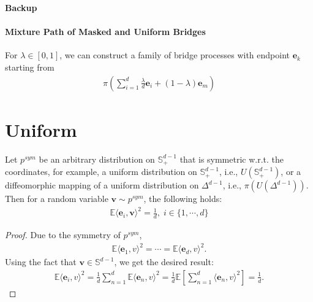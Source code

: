 \onecolumn

\begin{center}{\bf {\LARGE Backup}}\end{center}

\paragraph{Mixture Path of Masked and Uniform Bridges}
For $\lambda\in[0,1]$, we can construct a family of bridge processes with endpoint $\bm{e}_k$ starting from
\begin{align}
    \pi\left( \sum^{d}_{i=1} \frac{\lambda}{d}\bm{e}_i + (1-\lambda) \bm{e}_m \right)
\end{align}




\section{Uniform}


\begin{tcolorbox}
[colback=white,colframe=blue!30!white]
\begin{lemma}
\label{lem:uniform_expectation}
Let $p^{sym}$ be an arbitrary distribution on $\mathbb{S}^{d-1}_{+}$ that is symmetric w.r.t. the coordinates, for example, a uniform distribution on $\mathbb{S}^{d-1}_{+}$, i.e., $U(\mathbb{S}^{d-1}_{+})$, or a diffeomorphic mapping of a uniform distribution on $\Delta^{d-1}$, i.e., $\pi(U(\Delta^{d-1}))$.
Then for a random variable $\bm{v}\sim p^{sym}$, the following holds:
\begin{align}
    \mathbb{E}\langle \bm{e}_i,\bm{v}\rangle^2 = \frac{1}{d}, \; i\in\{1,\cdots,d\}
\end{align}
\end{lemma}
\end{tcolorbox}

\begin{proof}
Due to the symmetry of $p^{sym}$, 
\begin{align}
    \mathbb{E}\langle\bm{e}_1,v\rangle^2 = \cdots = \mathbb{E}\langle\bm{e}_d,v\rangle^2.
\end{align}
Using the fact that $\bm{v}\in\mathbb{S}^{d-1}$, we get the desired result:
\begin{align}
    \mathbb{E}\langle\bm{e}_i,v\rangle^2 
    = \frac{1}{d}\sum^{d}_{n=1} \mathbb{E}\langle\bm{e}_n,v\rangle^2 
    = \frac{1}{d}\mathbb{E}\left[\sum^{d}_{n=1}\langle\bm{e}_n,v\rangle^2\right]
    = \frac{1}{d}.
\end{align}
\end{proof}



